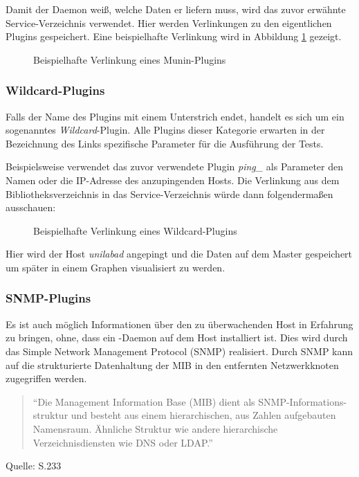 Damit der Daemon weiß, welche Daten er liefern muss, wird das zuvor erwähnte Service-Verzeichnis verwendet.
Hier werden Verlinkungen zu den eigentlichen Plugins gespeichert.
Eine beispielhafte Verlinkung wird in Abbildung \ref{lns} gezeigt.

\begin{figure}[ht]
	\centering
		\caption{Beispielhafte Verlinkung eines Munin-Plugins}
		\label{lns}
\end{figure}

\subsubsection{Wildcard-Plugins}
\label{wildcard}
Falls der Name des Plugins mit einem Unterstrich endet, handelt es sich um ein sogenanntes \textit{Wildcard}-Plugin.
Alle Plugins dieser Kategorie erwarten in der Bezeichnung des Links spezifische Parameter für die Ausführung der Tests.

Beispielsweise verwendet das zuvor verwendete Plugin \textit{ping\_} als Parameter den Namen oder die IP-Adresse des anzupingenden Hosts.
Die Verlinkung aus dem Bibliotheksverzeichnis in das Service-Verzeichnis würde dann folgendermaßen ausschauen:
\begin{figure}[ht]
	\centering
		\caption{Beispielhafte Verlinkung eines Wildcard-Plugins}
		\label{lnw}
\end{figure}

Hier wird der Host \textit{unilabad} angepingt und die Daten auf dem Master gespeichert um später in einem Graphen visualisiert zu werden.

\newpage

\subsubsection{SNMP-Plugins}
Es ist auch möglich Informationen über den zu überwachenden Host in Erfahrung zu bringen, ohne, dass ein -Daemon auf dem Host installiert ist.
Dies wird durch das Simple Network Management Protocol (SNMP) realisiert.
Durch SNMP kann auf die strukturierte Datenhaltung der MIB in den entfernten Netzwerkknoten zugegriffen werden.
\begin{quote}"`Die Management Information Base (MIB) dient als SNMP-Informations-struktur und besteht aus einem hierarchischen, aus Zahlen aufgebauten Namensraum. Ähnliche Struktur wie andere hierarchische Verzeichnisdiensten wie DNS oder LDAP."'\end{quote}
\begin{flushright}
Quelle: \cite{Barth08} S.233
\end{flushright}

